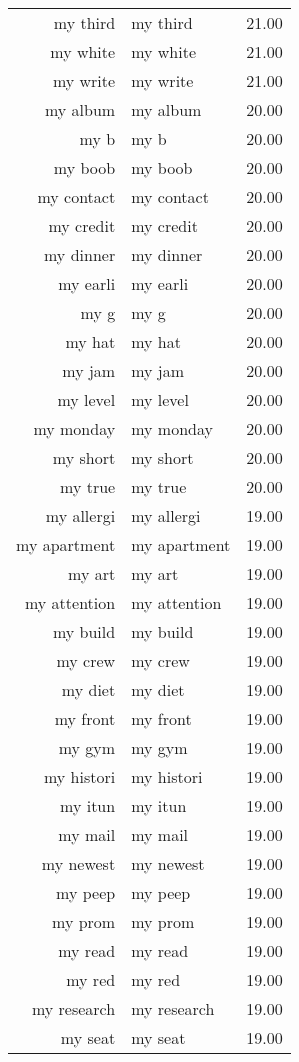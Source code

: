 \begin{table}[ht]
\begin{tabular}{rlr}
  my third & my third & 21.00 \\ 
  my white & my white & 21.00 \\ 
  my write & my write & 21.00 \\ 
  my album & my album & 20.00 \\ 
  my b & my b & 20.00 \\ 
  my boob & my boob & 20.00 \\ 
  my contact & my contact & 20.00 \\ 
  my credit & my credit & 20.00 \\ 
  my dinner & my dinner & 20.00 \\ 
  my earli & my earli & 20.00 \\ 
  my g & my g & 20.00 \\ 
  my hat & my hat & 20.00 \\ 
  my jam & my jam & 20.00 \\ 
  my level & my level & 20.00 \\ 
  my monday & my monday & 20.00 \\ 
  my short & my short & 20.00 \\ 
  my true & my true & 20.00 \\ 
  my allergi & my allergi & 19.00 \\ 
  my apartment & my apartment & 19.00 \\ 
  my art & my art & 19.00 \\ 
  my attention & my attention & 19.00 \\ 
  my build & my build & 19.00 \\ 
  my crew & my crew & 19.00 \\ 
  my diet & my diet & 19.00 \\ 
  my front & my front & 19.00 \\ 
  my gym & my gym & 19.00 \\ 
  my histori & my histori & 19.00 \\ 
  my itun & my itun & 19.00 \\ 
  my mail & my mail & 19.00 \\ 
  my newest & my newest & 19.00 \\ 
  my peep & my peep & 19.00 \\ 
  my prom & my prom & 19.00 \\ 
  my read & my read & 19.00 \\ 
  my red & my red & 19.00 \\ 
  my research & my research & 19.00 \\ 
  my seat & my seat & 19.00 \\ 

\end{tabular}
\end{table}
